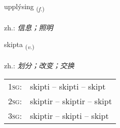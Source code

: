 \documentclass[frontgrid, backgrid]{flacards}\usepackage[]{graphicx}\usepackage[]{xcolor}
\begin{document}
\renewcommand{\blhead}{\vskip5pt {\small\bfseries\footnotesize Nafnorð | 名词 }}
\renewcommand{\bcfoot}{\vskip5pt \hspace{2pt}{\small\bfseries\footnotesize 1K}}


{upplýsing \small{\textsubscript{(\textit{f.})}} \\[1ex] %
\textphonetic{[ʏhplisiŋk]} \\
zh.: \emph{信息；照明} \\  [2ex]
\renewcommand*{\arraystretch}{0.8}
}

\renewcommand{\flhead}{\vskip5pt \fboxsep=0pt {\small\bfseries\footnotesize Sagnorð | 动词}}
\renewcommand{\fcfoot}{\vskip5pt \fboxsep=0pt \hspace{2pt}{\small\bfseries\footnotesize 1K}}

\renewcommand{\blhead}{\vskip5pt {\small\bfseries\footnotesize Sagnorð | 动词 }}
\renewcommand{\bcfoot}{\vskip5pt \hspace{2pt}{\small\bfseries\footnotesize 1K}}


{skipta \small{\textsubscript{(\textit{v.})}} \\[1ex] %
\textphonetic{[scɪfta]} \\
zh.: \emph{划分；改变；交换} \\  [2ex]
\renewcommand*{\arraystretch}{0.8}
\begin{tabular}{p{1cm}l}
\textsc{1sg}: & skipti -- skipti -- skipt \\ 
\textsc{2sg}: & skiptir -- skiptir -- skipt \\ 
\textsc{3sg}: & skiptir -- skipti -- skipt \\ 
\end{tabular}
}

\end{document}

